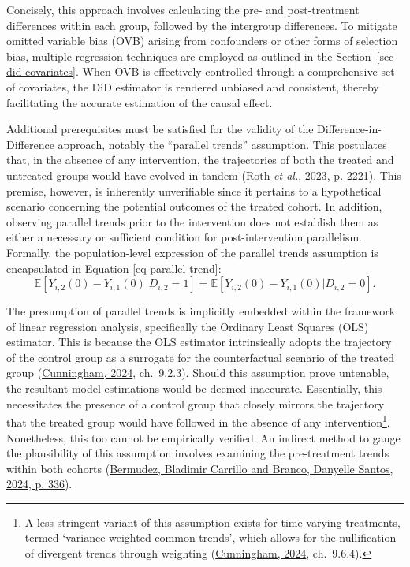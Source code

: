 \documentclass[12pt, a4paper, twoside]{article}
\numberwithin{equation}{subsection} %
\begin{document}
Concisely, this approach involves calculating the pre- and
post-treatment differences within each group, followed by the intergroup
differences. To mitigate omitted variable bias (OVB) arising from
confounders or other forms of selection bias, multiple regression
techniques are employed as outlined in the
Section~\ref{sec-did-covariates}. When OVB is effectively controlled
through a comprehensive set of covariates, the DiD estimator is rendered
unbiased and consistent, thereby facilitating the accurate estimation of
the causal effect.

Additional prerequisites must be satisfied for the validity of the
Difference-in-Difference approach, notably the ``parallel trends''
assumption. This postulates that, in the absence of any intervention,
the trajectories of both the treated and untreated groups would have
evolved in tandem (\protect\hyperlink{ref-roth_whats_2023}{Roth \emph{et
al.}, 2023, p. 2221}). This premise, however, is inherently unverifiable
since it pertains to a hypothetical scenario concerning the potential
outcomes of the treated cohort. In addition, observing parallel trends
prior to the intervention does not establish them as either a necessary
or sufficient condition for post-intervention parallelism. Formally, the
population-level expression of the parallel trends assumption is
encapsulated in Equation \eqref{eq-parallel-trend}: \begin{equation}
\label{eq-parallel-trend}
   \mathbb{E}[Y_{i,2}(0) - Y_{i,1}(0) | D_{i,2} = 1] = \mathbb{E}[Y_{i,2}(0) - Y_{i,1}(0) | D_{i,2} = 0].
\end{equation}

The presumption of parallel trends is implicitly embedded within the
framework of linear regression analysis, specifically the Ordinary Least
Squares (OLS) estimator. This is because the OLS estimator intrinsically
adopts the trajectory of the control group as a surrogate for the
counterfactual scenario of the treated group
(\protect\hyperlink{ref-cunningham_causal_2024}{Cunningham, 2024},
ch.~9.2.3). Should this assumption prove untenable, the resultant model
estimations would be deemed inaccurate. Essentially, this necessitates
the presence of a control group that closely mirrors the trajectory that
the treated group would have followed in the absence of any
intervention\footnote{A less stringent variant of this assumption exists
  for time-varying treatments, termed `variance weighted common trends',
  which allows for the nullification of divergent trends through
  weighting (\protect\hyperlink{ref-cunningham_causal_2024}{Cunningham,
  2024}, ch.~9.6.4).}. Nonetheless, this too cannot be empirically
verified. An indirect method to gauge the plausibility of this
assumption involves examining the pre-treatment trends within both
cohorts
(\protect\hyperlink{ref-bladimir_carrillo_bermudez_o_2024}{Bermudez,
Bladimir Carrillo and Branco, Danyelle Santos, 2024, p. 336}).
\end{document}
